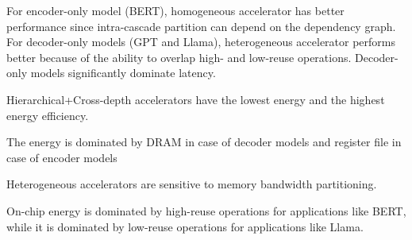 \squishlist
\item For encoder-only model (BERT), homogeneous accelerator has better performance since intra-cascade partition can depend on the dependency graph. For decoder-only models (GPT and Llama), heterogeneous accelerator performs better because of the ability to overlap high- and low-reuse operations. Decoder-only models significantly dominate latency.
\item Hierarchical+Cross-depth accelerators have the lowest energy and the highest energy efficiency.
\item The energy is dominated by DRAM in case of decoder models and register file in case of encoder models
\item Heterogeneous accelerators are sensitive to memory bandwidth partitioning.
\item On-chip energy is dominated by high-reuse operations for applications like BERT, while it is dominated by low-reuse operations for applications like Llama.
\squishend